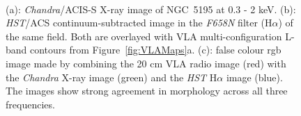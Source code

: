 \documentclass[fleqn,usenatbib]{mnras}
\def\fig{Figure}
\begin{document}
\begin{figure}
{\\

\caption{(a): \textit{Chandra}/ACIS-S X-ray image of NGC~5195 at 0.3 - 2 keV. (b): \textit{HST}/ACS continuum-subtracted image in the \textit{F658N} filter (H$\alpha$) of the same field. Both are overlayed with VLA multi-configuration L-band contours from \fig~\ref{fig:VLAMaps}a. (c): false colour rgb image made by combining the 20 cm VLA radio image (red) with the \textit{Chandra} X-ray image (green) and the \textit{HST} H$\alpha$ image (blue). The images show strong agreement in morphology across all three frequencies.}
\label{fig:VLAHalpha}
}
\end{figure}
\end{document}

